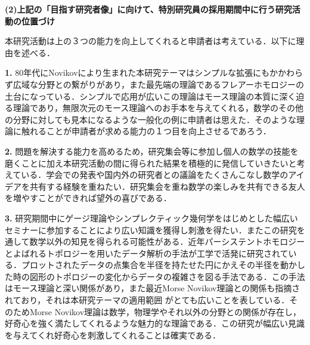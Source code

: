 \documentclass[11pt,a4j,dvipdfmx]{jarticle} 					%
\newcommand{\研究課題名}{象の卵}
\newcommand{\研究機関名}{京都大学}
\newcommand{\研究代表者氏名}{福士謙二}
\begin{document}
\vspace{5mm}
\noindent
\textbf{(2)上記の「目指す研究者像」に向けて、特別研究員の採用期間中に行う研究活動の位置づけ}



本研究活動は上の３つの能力を向上してくれると申請者は考えている．以下に理由を述べる．


\noindent\textbf{1. }80年代にNovikovにより生まれた本研究テーマはシンプルな拡張にもかかわらず広域な分野との繋がりがあり，また最先端の理論であるフレアーホモロジーの土台になっている．シンプルで応用が広いこの理論はモース理論の本質に深く迫る理論であり，無限次元のモース理論へのお手本を与えてくれる，数学のその他の分野に対しても見本になるような一般化の例に申請者は思えた．そのような理論に触れることが申請者が求める能力の１つ目を向上させるであろう．


\noindent\textbf{2. }問題を解決する能力を高めるため，研究集会等に参加し個人の数学の技能を磨くことに加え本研究活動の間に得られた結果を積極的に発信していきたいと考えている．学会での発表や国内外の研究者との議論をたくさんこなし数学のアイデアを共有する経験を重ねたい．研究集会を重ね数学の楽しみを共有できる友人を増やすことができれば望外の喜びである．


\noindent\textbf{3. }研究期間中にゲージ理論やシンプレクティック幾何学をはじめとした幅広いセミナーに参加することにより広い知識を獲得し刺激を得たい．またこの研究を通して数学以外の知見を得られる可能性がある．近年パーシステントホモロジーとよばれるトポロジーを用いたデータ解析の手法が工学で活発に研究されている．プロットされたデータの点集合を半径を持たせた円にかえその半径を動かした時の図形のトポロジーの変化からデータの複雑さを図る手法である．この手法はモース理論と深い関係があり，また最近Morse Novikov理論との関係も指摘されており，それは本研究テーマの適用範囲
がとても広いことを表している．そのためMorse Novikov理論は数学，物理学やそれ以外の分野との関係が存在し，好奇心を強く満たしてくれるような魅力的な理論である．この研究が幅広い見識を与えてくれ好奇心を刺激してくれることは確実である．







\end{document}
